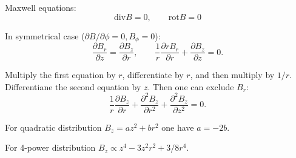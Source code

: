 \documentclass[a4paper]{article}
\begin{document}
Maxwell equations:
$$
\mbox{div} B = 0,\qquad
\mbox{rot} B = 0
$$

In symmetrical case ($\partial B/\partial\phi = 0, B_\phi=0$):
$$
\frac{\partial B_r}{\partial z} = \frac{\partial B_z}{\partial r}, \qquad
\frac{1}{r} \frac{\partial r B_r}{\partial r} + \frac{\partial B_z}{\partial z}=0.
$$

Multiply the first equation by $r$, differentiate by $r$, and then multiply by $1/r$.
Differentiane the second equation by $z$. Then one can exclude $B_r$:
$$
\frac{1}{r} \frac{\partial B_z}{\partial r}
 + \frac{\partial^2 B_z}{\partial r^2}
 + \frac{\partial^2 B_z}{\partial z^2}=0.
$$

For quadratic distribution $B_z = az^2 + br^2$ one have $a=-2b$.

For 4-power distribution $B_z \propto z^4 - 3 z^2 r^2 + 3/8 r^4$.
\end{document}

